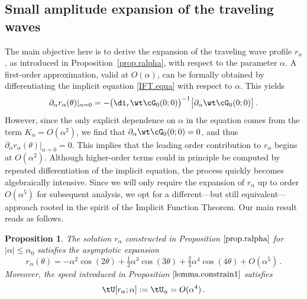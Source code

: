 \documentclass[a4paper,reqno,10pt]{article}
\newtheorem{pro}{Proposition}[section]
\newcommand{\pa}{\partial}
\begin{document}
\subsection{Small amplitude expansion of the traveling waves}
The main objective here is to derive the expansion of the traveling wave profile $ r_\alpha $, as introduced in \mbox{Proposition \ref{prop.ralpha}}, with respect to the parameter $\alpha$. A first-order approximation, valid at $ O(\alpha) $, can be formally obtained by differentiating the implicit equation \eqref{IFT.equa} with respect to $\alpha$. This yields
\begin{equation}
	\pa_{\alpha} r_\alpha(\theta)|_{\alpha=0} = - \big(\di_{r} \wt\cG_{0}(0;0) \big)^{-1}\big[ \pa_{\alpha} \wt\cG_{0}(0;0) \big]\,.
\end{equation}
However, since the only explicit dependence on $\alpha$ in the equation comes from the term $ K_\alpha = O(\alpha^2)$, we find that $\partial_{\alpha} \wt\cG_{0}(0;0) = 0 $, and thus
$\pa_{\alpha} r_\alpha(\theta)|_{\alpha=0} =0$.
This implies that the leading order contribution to $ r_\alpha $ begins at $ O(\alpha^2) $. Although higher-order terms could in principle be computed by repeated differentiation of the implicit equation, the process quickly becomes algebraically intensive. Since we will only require the expansion of $ r_\alpha $ up to order $ O(\alpha^5) $ for subsequent analysis, we opt for a different—but still equivalent—approach rooted in the spirit of the Implicit Function Theorem. Our main result reads as follows.
{
\begin{pro}\label{prop.asympt.ralpha}
	The  solution $r_\alpha$ constructed in Proposition $\ref{prop.ralpha}$ for $|\alpha|\leq \alpha_{0}$ satisfies the asymptotic expansion
	\begin{equation}\label{ralpha.asymp}
		r_\alpha(\theta) = - \alpha^2 \cos(2\theta)  +\tfrac12 \alpha^3 \cos(3\theta)+\tfrac23 \alpha^4 \cos(4\theta)  + O(\alpha^5)\,.
	\end{equation}
    Moreover, the speed introduced in Proposition $\ref{lemma.constrain1}$ satisfies
   $$
   \tU[{r}_\alpha;\alpha]:=\tU_\alpha=O(\alpha^4) \,.
   $$
\end{pro}}
\end{document}
